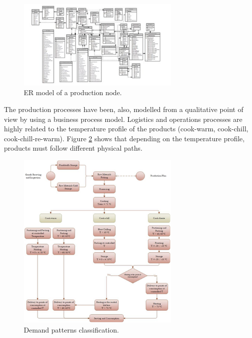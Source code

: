 \begin{figure}[hbt!]
\centering
\includegraphics[width=0.7\textwidth]{sectionProduction/control_figures/fig_prod_CAMST_ER.png}
\captionsetup{type=figure}
\caption{ER model of a production node.}
\label{fig_prod_CAMST_ER}
\end{figure}

The production processes have been, also, modelled from a qualitative point of view by using a business process model. Logistics and operations processes are highly related to the temperature profile of the products (cook-warm, cook-chill, cook-chill-re-warm). Figure \ref{fig_prod_CAMST_flowchart} shows that depending on the temperature profile, products must follow different physical paths.

\begin{figure}[hbt!]
\centering
\includegraphics[width=0.7\textwidth]{sectionProduction/control_figures/fig_prod_CAMST_flowchart.png}
\captionsetup{type=figure}
\caption{Demand patterns classification.}
\label{fig_prod_CAMST_flowchart}
\end{figure}

